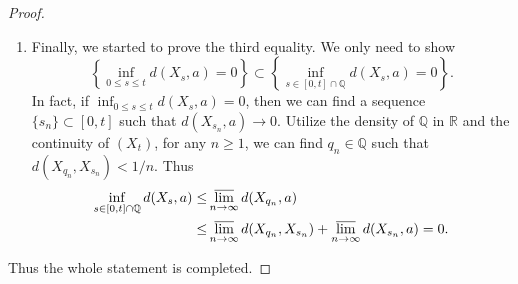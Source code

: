 \documentclass[12pt]{article}
\renewcommand{\(}{\left(}%
\renewcommand{\)}{\right)}%
\renewcommand{\[}{\left[}%
\renewcommand{\]}{\right]}%
\renewcommand{\r}{\mathbb{R}}
\newcommand{\q}{\mathbb{Q}}
\newtheorem{proof}{Proof.}}
\begin{document}
\begin{proof}
\begin{enumerate}
\begin{equation*}
  	 	\{\exists 0\leq s\leq t, X_s=a \}\supset \left\{\inf_{0\leq s\leq t}d(X_s,a)=0\right\}.
  	 \end{equation*}
  		\item Finally, we started to prove the third equality. We only need to show
  		\begin{equation*}
  			\left\{\inf_{0\leq s\leq t}d(X_s,a)=0\right\}\subset \left\{\inf_{s\in[0,t]\cap\q}d(X_s,a)=0\right\}.
  		\end{equation*}
  		In fact, if $\inf_{0\leq s\leq t}d(X_s,a)=0$, then we can find a sequence $\{s_n\}\subset[0,t]$ such that $d(X_{s_n},a)\to 0$. Utilize the density of $\q $ in $\r$ and the continuity of $(X_t)$, for any $n\geq 1$, we can find $q_n\in\q$ such that $d(X_{q_n},X_{s_n})<1/n$. Thus 
  		\begin{equation*}
  			\begin{split}
  				\inf_{s\in[0,t]\cap\q}d(X_s,a)\leq& \varlimsup_{n\to\infty}d(X_{q_n},a)\\
  				\leq& \varlimsup_{n\to\infty}d(X_{q_n},X_{s_n})+\varlimsup_{n\to\infty}d(X_{s_n},a)=0.
  			\end{split}
  		\end{equation*}
  	\end{enumerate}
  	Thus the whole statement is completed.
  \end{proof}
  
\end{document}
